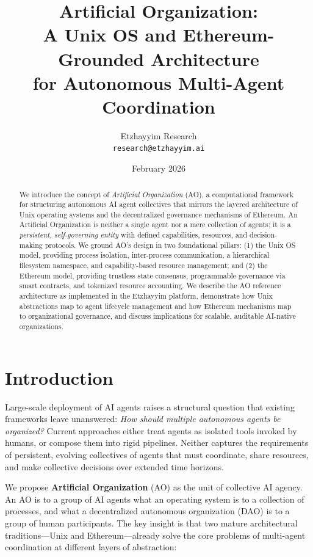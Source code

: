 \documentclass[11pt,a4paper]{article}
\title{Artificial Organization: \\ A Unix OS and Ethereum-Grounded Architecture \\ for Autonomous Multi-Agent Coordination}
\author{
  Etzhayyim Research \\
  \texttt{research@etzhayyim.ai}
}
\date{February 2026}
\begin{document}
\maketitle

\begin{abstract}
We introduce the concept of \emph{Artificial Organization} (AO), a computational
framework for structuring autonomous AI agent collectives that mirrors the
layered architecture of Unix operating systems and the decentralized governance
mechanisms of Ethereum. An Artificial Organization is neither a single agent nor
a mere collection of agents; it is a \emph{persistent, self-governing entity}
with defined capabilities, resources, and decision-making protocols. We ground
AO's design in two foundational pillars: (1) the Unix OS model, providing
process isolation, inter-process communication, a hierarchical filesystem
namespace, and capability-based resource management; and (2) the Ethereum
model, providing trustless state consensus, programmable governance via smart
contracts, and tokenized resource accounting. We describe the AO reference
architecture as implemented in the Etzhayyim platform, demonstrate how Unix
abstractions map to agent lifecycle management and how Ethereum mechanisms map
to organizational governance, and discuss implications for scalable, auditable
AI-native organizations.
\end{abstract}

\section{Introduction}

Large-scale deployment of AI agents raises a structural question that existing
frameworks leave unanswered: \emph{How should multiple autonomous agents be
organized?} Current approaches either treat agents as isolated tools invoked by
humans, or compose them into rigid pipelines. Neither captures the requirements
of persistent, evolving collectives of agents that must coordinate, share
resources, and make collective decisions over extended time horizons.

We propose \textbf{Artificial Organization} (AO) as the unit of collective AI
agency. An AO is to a group of AI agents what an operating system is to a
collection of processes, and what a decentralized autonomous organization (DAO)
is to a group of human participants. The key insight is that two mature
architectural traditions---Unix and Ethereum---already solve the core problems
of multi-agent coordination at different layers of abstraction:
\end{document}
